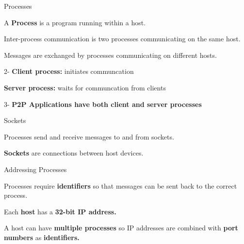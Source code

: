 \begin{topic}{Processes}

A \textbf{Process} is a program running within a host.

Inter-process communication is two processes communicating on the same host.

Messages are exchanged by processes communicating on different hosts.

\begin{subtopic}{2-}
\textbf{Client process:} initiates communcation

\textbf{Server process:} waits for communcation from clients
\end{subtopic}

\begin{subtopic}{3-}
\textbf{P2P Applications have both client and server processes}
\end{subtopic}

\end{topic}

\begin{topic}{Sockets}

Processes send and receive messages to and from sockets.

\textbf{Sockets} are connections between host devices.

\end{topic}

\begin{topic}{Addressing Processes}

Processes require \textbf{identifiers} so that messages can be sent back to the correct process.

Each \textbf{host} has a \textbf{32-bit IP address.}

A host can have \textbf{multiple processes} so IP addresses are combined with \textbf{port numbers} as \textbf{identifiers.}

\end{topic}

